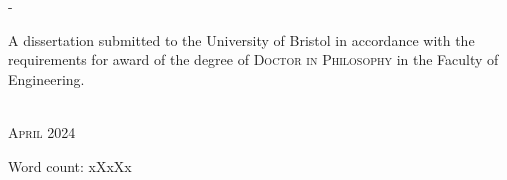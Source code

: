\begin{titlingpage}
\begin{SingleSpace}
\begin{adjustwidth*}{\unitlength}{-\unitlength}
\begin{center}
\vspace{11mm}
\begin{minipage}{10cm}
\center A dissertation submitted to the University of Bristol in accordance with the requirements for award of the degree of \textsc{Doctor in Philosophy} in the Faculty of Engineering.
\end{minipage}\\
\vspace{9mm}
{\large\textsc{April 2024}}
\vspace{12mm}
\end{center}
\begin{flushright}
{\small Word count: xXxXx}
\end{flushright}
\end{adjustwidth*}
\end{SingleSpace}
\end{titlingpage}